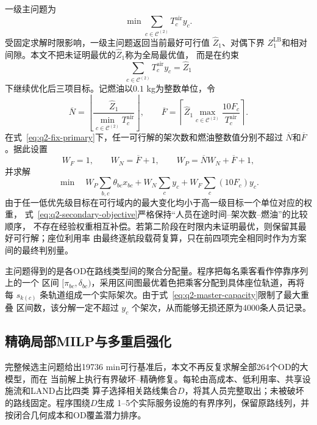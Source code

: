 \documentclass[UTF8,a4paper,zihao=5]{ctexart}
\begin{document}
一级主问题为
\begin{equation}
  \min\sum_{c\in\mathcal C^{(2)}}T_c^{\mathrm{air}}y_c.
  \label{eq:q2-master-primary}
\end{equation}
受固定求解时限影响，一级主问题返回当前最好可行值 $\widehat Z_1$、对偶下界
$Z_1^{\mathrm{LB}}$和相对间隙。本文不把未证明最优的$\widehat Z_1$称为全局最优值，
而是在约束
\begin{equation}
  \sum_{c\in\mathcal C^{(2)}}T_c^{\mathrm{air}}y_c=\widehat Z_1
  \label{eq:q2-fix-primary}
\end{equation}
下继续优化后三项目标。记燃油以$0.1$ kg为整数单位，令
\begin{equation}
  \overline N=\left\lfloor
  \frac{\widehat Z_1}{\min_{c\in\mathcal C^{(2)}}T_c^{\mathrm{air}}}
  \right\rfloor,
  \qquad
  \overline F=\left\lceil
  \widehat Z_1\max_{c\in\mathcal C^{(2)}}
  \frac{10F_c}{T_c^{\mathrm{air}}}
  \right\rceil .
  \label{eq:q2-secondary-bounds}
\end{equation}
在式~\eqref{eq:q2-fix-primary}下，任一可行解的架次数和燃油整数值分别不超过
$\overline N$和$\overline F$。据此设置
\begin{equation}
  W_F=1,\qquad
  W_N=\overline F+1,\qquad
  W_P=\overline N W_N+\overline F+1,
  \label{eq:q2-dominance-weights}
\end{equation}
并求解
\begin{equation}
  \min\quad
  W_P\sum_{b,c}\theta_{bc}x_{bc}
  +W_N\sum_cy_c
  +W_F\sum_c(10F_c)y_c.
  \label{eq:q2-secondary-objective}
\end{equation}
由于任一低优先级目标在可行域内的最大变化均小于高一级目标一个单位对应的权重，
式~\eqref{eq:q2-secondary-objective}严格保持“人员在途时间--架次数--燃油”的比较顺序，
不存在经验权重相互补偿。若第二阶段在时限内未证明最优，则保留其最好可行解；座位利用率
由最终逐航段载荷复算，只在前四项完全相同时作为方案间的最终判别量。

主问题得到的是各OD在路线类型间的聚合分配量。程序把每名乘客看作停靠序列上的一个
区间 $[\pi_{bc},\delta_{bc})$，采用区间图最优着色把乘客分配到具体座位轨道，再将每
$s_{k(c)}$ 条轨道组成一个实际架次。由于式~\eqref{eq:q2-master-capacity}限制了最大重叠
区间数，该分解一定不超过 $y_c$ 个架次，从而能够无损还原为4000条人员记录。

\subsection{精确局部MILP与多重启强化}

完整候选主问题给出19736 min可行基准后，本文不再反复求解全部264个OD的大模型，而在
当前解上执行有界破坏--精确修复。每轮由高成本、低利用率、共享设施流和LAND占比四类
算子选择相关路线集合$D$，将其人员完整取出；未被破坏的路线固定。程序围绕$D$生成
1--5个实际服务设施的有界序列，保留原路线列，并按闭合几何成本和OD覆盖潜力排序。
\end{document}
